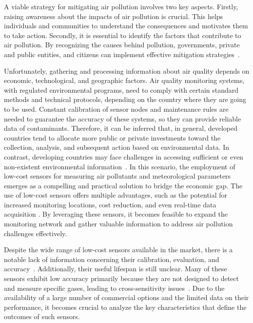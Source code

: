 \documentclass[10pt]{../style_src/imeko_acta}
\begin{document}
A viable strategy for mitigating air pollution involves two key aspects. Firstly, raising awareness about the impacts of air pollution is crucial. This helps individuals and communities to understand the consequences and motivates them to take action. Secondly, it is essential to identify the factors that contribute to air pollution. By recognizing the causes behind pollution, governments, private and public entities, and citizens can implement effective mitigation strategies~\cite{sofia}.

Unfortunately, gathering and processing information about air quality depends on economic, technological, and geographic factors. Air quality monitoring systems, with regulated environmental programs, need to comply with certain standard methods and technical protocols, depending on the country where they are going to be used. Constant calibration of sensor nodes and maintenance rules are needed to guarantee the accuracy of these systems, so they can provide reliable data of contaminants.
Therefore, it can be inferred that, in general, developed countries tend to allocate more public or private investments toward the collection, analysis, and subsequent action based on environmental data. In contrast, developing countries may face challenges in accessing sufficient or even non-existent environmental information~\cite{BALDASANO}.
In this scenario, the employment of low-cost sensors for measuring air pollutants and meteorological parameters emerges as a compelling and practical solution to bridge the economic gap. The use of low-cost sensors offers multiple advantages, such as the potential for increased monitoring locations, cost reduction, and even real-time data acquisition \cite{atmos10090506}. By leveraging these sensors, it becomes feasible to expand the monitoring network and gather valuable information to address air pollution challenges effectively.

Despite the wide range of low-cost sensors available in the market, there is a notable lack of information concerning their calibration, evaluation, and accuracy~\cite{LIU2020109438}. Additionally, their useful lifespan is still unclear. Many of these sensors exhibit low accuracy primarily because they are not designed to detect and measure specific gases, leading to cross-sensitivity issues~\cite{atmos10090506}. Due to the availability of a large number of commercial options and the limited data on their performance, it becomes crucial to analyze the key characteristics that define the outcomes of such sensors.
\end{document}

